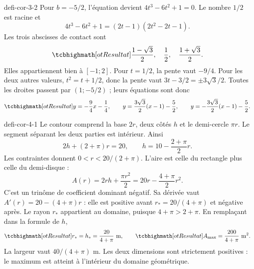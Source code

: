 \begin{blocEdition}{defi-cor-3-2}
Pour $b=-5/2$, l'équation devient $4t^3-6t^2+1=0$.
Le nombre $1/2$ est racine et
\[4t^3-6t^2+1=(2t-1)(2t^2-2t-1).\]
Les trois abscisses de contact sont
\[\res{\frac{1-\sqrt3}{2},\quad\frac12,\quad\frac{1+\sqrt3}{2}}.\]
Elles appartiennent bien à $[-1;2]$. Pour $t=1/2$, la pente vaut $-9/4$.
Pour les deux autres valeurs, $t^2=t+1/2$, donc la pente vaut $3t-3/2=\pm3\sqrt3/2$.
Toutes les droites passent par $(1;-5/2)$ ; leurs équations sont donc
\[\res{y=-\frac94x-\frac14},\qquad
y=\frac{3\sqrt3}{2}(x-1)-\frac52,\qquad
y=-\frac{3\sqrt3}{2}(x-1)-\frac52.\]
\label{figedition-defi-cor-3-2-1}
\end{blocEdition}

\begin{blocEdition}{defi-cor-4-1}
Le contour comprend la base $2r$, deux côtés $h$ et le demi-cercle $\pi r$.
Le segment séparant les deux parties est intérieur. Ainsi
\[2h+(2+\pi)r=20,\qquad h=10-\frac{2+\pi}{2}r.\]
Les contraintes donnent $0<r<20/(2+\pi)$.
L'aire est celle du rectangle plus celle du demi-disque :
\[A(r)=2rh+\frac{\pi r^2}{2}=20r-\frac{4+\pi}{2}r^2.\]
C'est un trinôme de coefficient dominant négatif. Sa dérivée vaut
$A'(r)=20-(4+\pi)r$ : elle est positive avant $r_*=20/(4+\pi)$ et négative après.
Le rayon $r_*$ appartient au domaine, puisque $4+\pi>2+\pi$.
En remplaçant dans la formule de $h$,
\[\res{r_*=h_*=\frac{20}{4+\pi}\ \mathrm{m}},\qquad
\res{A_{\max}=\frac{200}{4+\pi}\ \mathrm{m}^2}.\]
La largeur vaut $40/(4+\pi)$ m. Les deux dimensions sont strictement positives :
le maximum est atteint à l'intérieur du domaine géométrique.
\label{figedition-defi-cor-4-1-1}
\end{blocEdition}

